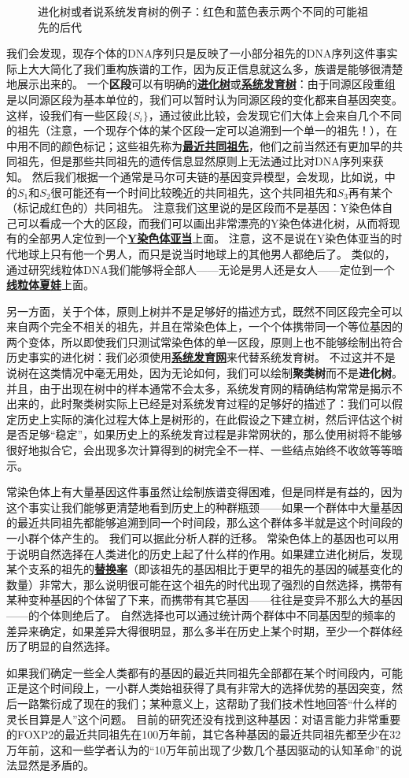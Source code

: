 \documentclass[hyperref, UTF8, a4paper, oneside]{ctexart}
\renewcommand{\emph}[1]{\textbf{#1}}
\newcommand*{\concept}[1]{\underline{\textbf{#1}}}
\numberwithin{equation}{section}
\begin{document}
\begin{figure}
    \centering
    
    \caption{进化树或者说系统发育树的例子：红色和蓝色表示两个不同的可能祖先的后代}
    \label{sec:tree-example}
\end{figure}

我们会发现，现存个体的DNA序列只是反映了一小部分祖先的DNA序列这件事实际上大大简化了我们重构族谱的工作，因为反正信息就这么多，族谱是能够很清楚地展示出来的。
一个\emph{区段}可以有明确的\concept{进化树}或\concept{系统发育树}：由于同源区段重组是以同源区段为基本单位的，我们可以暂时认为同源区段的变化都来自基因突变。
这样，设我们有一些区段$\{S_{i}\}$，通过彼此比较，会发现它们大体上会来自几个不同的祖先（注意，一个现存个体的某个区段一定可以追溯到一个单一的祖先！），在中用不同的颜色标记；这些祖先称为\concept{最近共同祖先}，他们之前当然还有更加早的共同祖先，但是那些共同祖先的遗传信息显然原则上无法通过比对DNA序列来获知。
然后我们根据一个通常是马尔可夫链的基因变异模型，会发现，比如说，中的$S_1$和$S_2$很可能还有一个时间比较晚近的共同祖先，这个共同祖先和$S_3$再有某个（标记成红色的）共同祖先。
注意我们这里说的是区段而不是基因：Y染色体自己可以看成一个大的区段，而我们可以画出非常漂亮的Y染色体进化树，从而将现有的全部男人定位到一个\concept{Y染色体亚当}上面。
注意，这不是说在Y染色体亚当的时代地球上只有他一个男人，而只是说当时地球上的其他男人都绝后了。
类似的，通过研究线粒体DNA我们能够将全部人——无论是男人还是女人——定位到一个\concept{线粒体夏娃}上面。

另一方面，关于个体，原则上树并不是足够好的描述方式，既然不同区段完全可以来自两个完全不相关的祖先，并且在常染色体上，一个个体携带同一个等位基因的两个变体，所以即使我们只测试常染色体的单一区段，原则上也不能够绘制出符合历史事实的进化树：我们必须使用\concept{系统发育网}来代替系统发育树。
不过这并不是说树在这类情况中毫无用处，因为无论如何，我们可以绘制\emph{聚类树}而不是\emph{进化树}。
并且，由于出现在树中的样本通常不会太多，系统发育网的精确结构常常是揭示不出来的，此时聚类树实际上已经是对系统发育过程的足够好的描述了：我们可以假定历史上实际的演化过程大体上是树形的，在此假设之下建立树，然后评估这个树是否足够“稳定”，如果历史上的系统发育过程是非常网状的，那么使用树将不能够很好地拟合它，会出现多次计算得到的树完全不一样、一些结点始终不收敛等等暗示。

常染色体上有大量基因这件事虽然让绘制族谱变得困难，但是同样是有益的，因为这个事实让我们能够更清楚地看到历史上的种群瓶颈——如果一个群体中大量基因的最近共同祖先都能够追溯到同一个时间段，那么这个群体多半就是这个时间段的一小群个体产生的。
我们可以据此分析人群的迁移。
常染色体上的基因也可以用于说明自然选择在人类进化的历史上起了什么样的作用。如果建立进化树后，发现某个支系的祖先的\concept{替换率}（即该祖先的基因相比于更早的祖先的基因的碱基变化的数量）非常大，那么说明很可能在这个祖先的时代出现了强烈的自然选择，携带有某种变种基因的个体留了下来，而携带有其它基因——往往是变异不那么大的基因——的个体则绝后了。
自然选择也可以通过统计两个群体中不同基因型的频率的差异来确定，如果差异大得很明显，那么多半在历史上某个时期，至少一个群体经历了明显的自然选择。

如果我们确定一些全人类都有的基因的最近共同祖先全部都在某个时间段内，可能正是这个时间段上，一小群人类始祖获得了具有非常大的选择优势的基因突变，然后一路繁衍成了现在的我们；某种意义上，这帮助了我们技术性地回答“什么样的灵长目算是人”这个问题。
目前的研究还没有找到这种基因：对语言能力非常重要的FOXP2的最近共同祖先在100万年前，其它各种基因的最近共同祖先都至少在32万年前，这和一些学者认为的“10万年前出现了少数几个基因驱动的认知革命”的说法显然是矛盾的。
\end{document}
